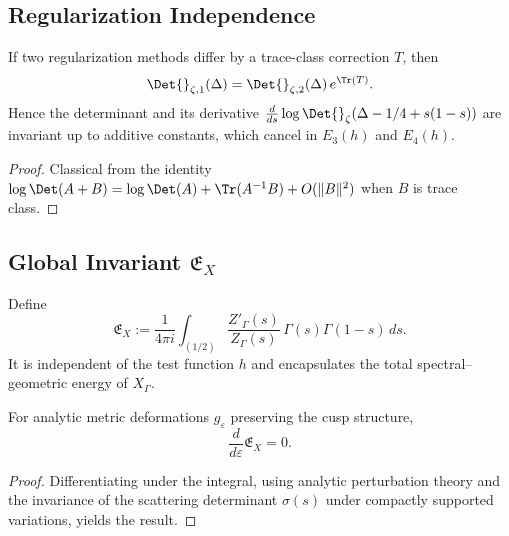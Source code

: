\subsection{Regularization Independence}\relax\hspace{0pt}
\label{subsec:regularization-independence}\relax\hspace{0pt}

\begin{proposition}\label{prop:regularization}\relax
If two regularization methods differ by a trace-class correction $T$, then
\[
\Det{}_{\zeta,1}(\Delta)=\Det{}_{\zeta,2}(\Delta)\,e^{\Tr(T)}.
\]
Hence the determinant and its derivative $\frac{d}{ds}\log\Det{}_\zeta(\Delta-1/4+s(1-s))$ are invariant up to additive constants, which cancel in $E_3(h)$ and $E_4(h)$. %
\end{proposition}

\begin{proof}\relax
Classical from the identity $\log\Det(A+B)=\log\Det(A)+\Tr(A^{-1}B)+O(\|B\|^2)$ when $B$ is trace class. %
\end{proof}

\subsection{Global Invariant $\mathfrak{E}_X$}\relax\hspace{0pt}
\label{subsec:global-invariant}\relax\hspace{0pt}

\begin{definition}\label{def:global-invariant}\relax
Define
\[
\mathfrak{E}_X:=\frac{1}{4\pi i}\int_{(1/2)}\frac{Z'_\Gamma(s)}{Z_\Gamma(s)}\,\Gamma(s)\Gamma(1-s)\,ds.
\]
It is independent of the test function $h$ and encapsulates the total spectral–geometric energy of $X_\Gamma$. %
\end{definition}

\begin{lemma}\label{lem:inv-under-def}\relax
For analytic metric deformations $g_\varepsilon$ preserving the cusp structure,
\[
\frac{d}{d\varepsilon}\mathfrak{E}_X=0.
\]
\end{lemma}

\begin{proof}\relax
Differentiating under the integral, using analytic perturbation theory and the invariance of the scattering determinant $\sigma(s)$ under compactly supported variations, yields the result. %
\end{proof}

